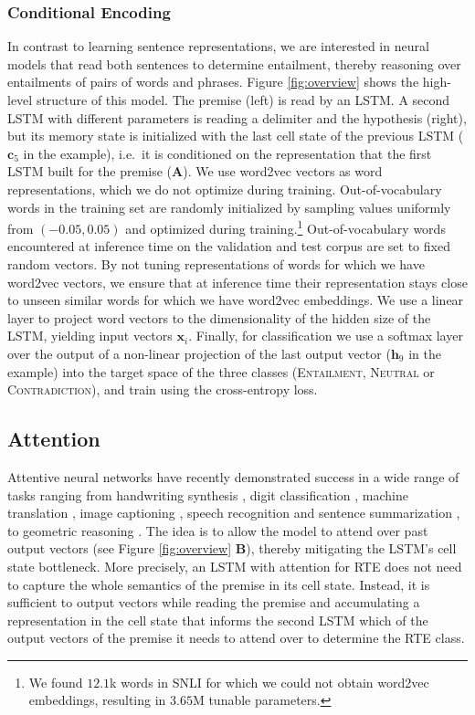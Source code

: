 \documentclass{article}
\begin{document}
\subsubsection{Conditional Encoding}
In contrast to learning sentence representations, we are interested in neural models that read both sentences to determine entailment, thereby reasoning over entailments of pairs of words and phrases.
Figure \ref{fig:overview} shows the high-level structure of this model. The premise (left) is read by an LSTM.
A second LSTM with different parameters is reading a delimiter and the hypothesis (right), but its memory state is initialized with the last cell state of the previous LSTM ($\mathbf{c}_5$ in the example), i.e.~it is conditioned on the representation that the first LSTM built for the premise (\textbf{A}).
We use word2vec vectors \citep{mikolov2013distributed} as word representations, which we do not optimize during training.
Out-of-vocabulary words in the training set are randomly initialized by sampling values uniformly from $(-0.05,0.05)$ and optimized during training.\footnote{We found $12.1$k words in SNLI for which we could not obtain word2vec embeddings, resulting in $3.65$M tunable parameters.}
Out-of-vocabulary words encountered at inference time on the validation and test corpus are set to fixed random vectors.
By not tuning representations of words for which we have word2vec vectors, we ensure that at inference time their representation stays close to unseen similar words for which we have word2vec embeddings.
We use a linear layer to project word vectors to the dimensionality of the hidden size of the LSTM, yielding input vectors $\mathbf{x}_i$.
Finally, for classification we use a softmax layer over the output of a non-linear projection of the last output vector ($\mathbf{h}_9$ in the example) into the target space of the three classes (\textsc{Entailment}, \textsc{Neutral} or \textsc{Contradiction}), and train using the cross-entropy loss.

\subsection{Attention}
\label{sec:att}

Attentive neural networks have recently demonstrated success in a wide range of tasks ranging from handwriting synthesis \citep{graves2013generating}, digit classification \citep{mnih2014recurrent}, machine translation \citep{bahdanau2015neural}, image captioning \citep{xu2015show}, speech recognition \citep{chorowski2015attention} and sentence summarization \citep{rush2015neural}, to geometric reasoning \citep{vinyals2015pointer}.
The idea is to allow the model to attend over past output vectors (see Figure \ref{fig:overview} \textbf{B}), thereby mitigating the LSTM's cell state bottleneck.
More precisely, an LSTM with attention for RTE does not need to capture the whole semantics of the premise in its cell state.
Instead, it is sufficient to output vectors while reading the premise and accumulating a representation in the cell state that informs the second LSTM which of the output vectors of the premise it needs to attend over to determine the RTE class.
\end{document}
